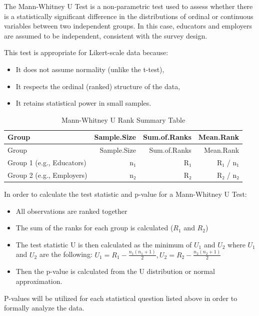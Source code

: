 \documentclass[
  11pt,
  letterpaper,
  DIV=11,
  numbers=noendperiod]{scrartcl}
\providecommand{\tightlist}{%
  \setlength{\itemsep}{0pt}\setlength{\parskip}{0pt}}\usepackage{longtable,booktabs,array}
\numberwithin{figure}{section}
\begin{document}
The Mann-Whitney U Test is a non-parametric test used to assess whether
there is a statistically significant difference in the distributions of
ordinal or continuous variables between two independent groups. In this
case, educators and employers are assumed to be independent, consistent
with the survey design.

This test is appropriate for Likert-scale data because:

\begin{itemize}
\tightlist
\item
  It does not assume normality (unlike the t-test),
\item
  It respects the ordinal (ranked) structure of the data,
\item
  It retains statistical power in small samples.
\end{itemize}

\begin{longtable}[]{@{}lrrr@{}}
\caption{Mann-Whitney U Rank Summary Table}\tabularnewline
\toprule\noalign{}
Group & Sample.Size & Sum.of.Ranks & Mean.Rank \\
\midrule\noalign{}
\endfirsthead
\toprule\noalign{}
Group & Sample.Size & Sum.of.Ranks & Mean.Rank \\
\midrule\noalign{}
\endhead
\bottomrule\noalign{}
\endlastfoot
Group 1 (e.g., Educators) & n₁ & R₁ & R₁ / n₁ \\
Group 2 (e.g., Employers) & n₂ & R₂ & R₂ / n₂ \\
\end{longtable}

In order to calculate the test statistic and p-value for a Mann-Whitney
U Test:

\begin{itemize}
\tightlist
\item
  All observations are ranked together
\item
  The sum of the ranks for each group is calculated (\(R_1\) and
  \(R_2\))
\item
  The test statistic U is then calculated as the minimum of \(U_1\) and
  \(U_2\) where \(U_1\) and \(U_2\) are the following:
  \(U_1 = R_1 - \frac{n_1(n_1 + 1)}{2},  U_2 = R_2 - \frac{n_2(n_2 + 1)}{2}\)
\item
  Then the p-value is calculated from the U distribution or normal
  approximation.
\end{itemize}

P-values will be utilized for each statistical question listed above in
order to formally analyze the data.
\end{document}
